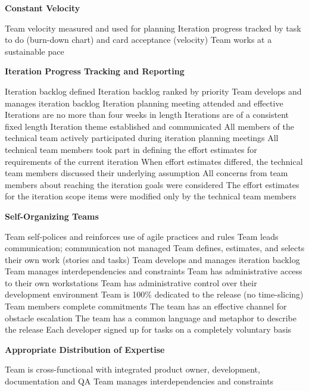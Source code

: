 \textbf{Constant Velocity}
\begin{itemize}
	\taa Team velocity measured and used for planning
	\taa Iteration progress tracked by task to do (burn-down chart) and card acceptance (velocity)
	\taa Team works at a sustainable pace 
\end{itemize}

\textbf{Iteration Progress Tracking and Reporting}
\begin{itemize}
	\taa Iteration backlog defined
	\taa Iteration backlog ranked by priority
	\taa Team develops and manages iteration backlog
	\taa Iteration planning meeting attended and effective
	\taa Iterations are no more than four weeks in length
	\taa Iterations are of a consistent fixed length
	\taa Iteration theme established and communicated 
	\pam All members of the technical team actively participated during iteration planning meetings
	\pam All technical team members took part in defining the effort estimates for 
requirements of the current iteration
	\pamr When effort estimates differed, the technical team members discussed their underlying assumption 
	\pamr All concerns from team members about reaching the iteration goals were  considered 
	\pamr The effort estimates for the iteration scope items were modified only by the  technical team members
\end{itemize}

\textbf{Self-Organizing Teams}
\begin{itemize}
	\taa Team self-polices and reinforces use of agile practices and rules
	\taa Team leads communication; communication not managed
	\taa Team defines, estimates, and selects their own work (stories and tasks)
	\taa Team develops and manages iteration backlog
	\taa Team manages interdependencies and constraints
	\taa Team has administrative access to their own workstations 
	\taa Team has administrative control over their development environment
	\taar Team is 100\% dedicated to the release (no time-slicing) 
	\taar Team members complete commitments 
	\taar The team has an effective channel for obstacle escalation
	\taar The team has a common language and metaphor to describe the release 
	\pam Each developer signed up for tasks on a completely voluntary basis
\end{itemize}

\textbf{Appropriate Distribution of Expertise}
\begin{itemize}
	\taa Team is cross-functional with integrated product owner, development, documentation and QA
	\taa Team manages interdependencies and constraints
\end{itemize}

